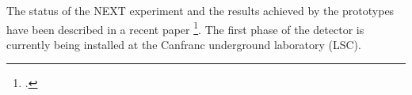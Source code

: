 
%


%
%
The status of the NEXT experiment and the results achieved by the prototypes have been described in a recent
paper \footcite{Gomez-Cadenas:2013lta}. The first phase of the detector is currently being installed at the Canfranc underground laboratory (LSC). 



